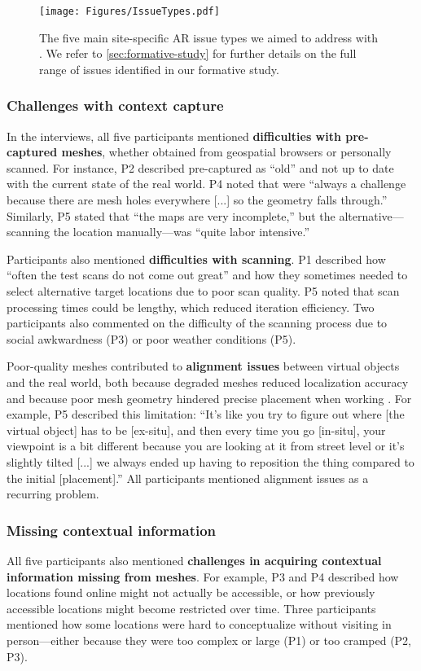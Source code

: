 \begin{figure*}
    \centering
    \texttt{[image: Figures/IssueTypes.pdf]}
    \caption{The five main site-specific AR issue types we aimed to address with \SystemName. We refer to \cref{sec:formative-study} for further details on the full range of issues identified in our formative study.}
    \label{fig:issue-types}
\end{figure*}

\subsubsection{Challenges with context capture}
In the interviews, all five participants mentioned \textbf{difficulties with pre-captured meshes}, whether obtained from geospatial browsers or personally scanned. For instance, P2 described pre-captured \locMeshes as ``old'' and not up to date with the current state of the real world. P4 noted that \locMeshes were ``always a challenge because there are mesh holes everywhere [...] so the geometry falls through.'' Similarly, P5 stated that ``the maps are very incomplete,'' but the alternative---scanning the location manually---was ``quite labor intensive.''

Participants also mentioned \textbf{difficulties with scanning}. P1 described how ``often the test scans do not come out great'' and how they sometimes needed to select alternative target locations due to poor scan quality. P5 noted that scan processing times could be lengthy, which reduced iteration efficiency. Two participants also commented on the difficulty of the scanning process due to social awkwardness (P3) or poor weather conditions (P5).

Poor-quality meshes contributed to \textbf{alignment issues} between virtual objects and the real world, both because degraded meshes reduced localization accuracy and because poor mesh geometry hindered precise placement when working \exsitu[ ]. For example, P5 described this limitation: ``It's like you try to figure out where [the virtual object] has to be [ex-situ], and then every time you go [in-situ], your viewpoint is a bit different because you are looking at it from street level or it's slightly tilted [...] we always ended up having to reposition the thing compared to the initial [placement].'' All participants mentioned alignment issues as a recurring problem.

\subsubsection{Missing contextual information}\label{sec:formative-study:missing-contextual-info}
All five participants also mentioned \textbf{challenges in acquiring contextual information missing from meshes}. For example, P3 and P4 described how locations found online might not actually be accessible, or how previously accessible locations might become restricted over time. Three participants mentioned how some locations were hard to conceptualize \exsitu[ ] without visiting in person---either because they were too complex or large (P1) or too cramped (P2, P3).

